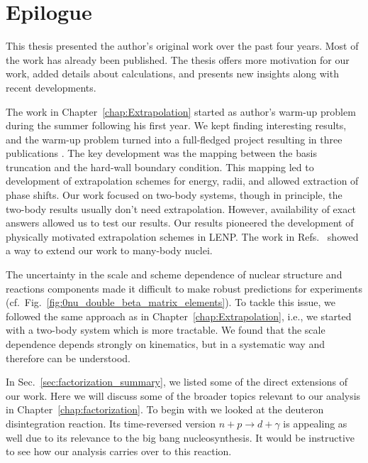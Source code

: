 \cleardoublepage
\chapter{Epilogue}

	This thesis presented the author's original work over the past four years.
	Most of the work has already been published.  The thesis offers more
	motivation for our work, added details about calculations, and
	presents new insights along with recent developments.

	The work in Chapter~\ref{chap:Extrapolation} started as author's warm-up
	problem during the summer following his first year.
	We kept finding
	interesting results, and the warm-up problem turned into a full-fledged
	project resulting in three publications
	\cite{More:2013rma,Furnstahl:2013vda,Konig:2014hma}.
	The key development was the mapping between the basis
	truncation and the hard-wall boundary condition.
	This mapping led to development of extrapolation schemes for energy, radii,
	and allowed extraction of phase shifts.
	Our work focused on two-body systems, though in principle, the
	two-body results usually don't need extrapolation.
	However, availability of exact answers allowed us to test our results.
	Our results pioneered
	the development of physically motivated extrapolation schemes in LENP.  
	The work in Refs.~\cite{Furnstahl:2014hca,Wendt:2015nba,Binder:2015trg}
	showed a way to extend our work to many-body nuclei.

	The uncertainty in the scale and scheme dependence of nuclear structure
	and reactions components made it difficult to make robust predictions
	for experiments (cf.~Fig.~\ref{fig:0nu_double_beta_matrix_elements}).
	To tackle this issue, we followed the same approach as in
	Chapter~\ref{chap:Extrapolation}, i.e., we started with a two-body
	system which is more tractable.  We found that the scale dependence
	depends strongly on kinematics, but in a systematic way and therefore
	can be understood.

	In Sec.~\ref{sec:factorization_summary}, we listed some of the direct
	extensions of our work.  Here we will discuss some of the broader topics
	relevant to our analysis in Chapter~\ref{chap:factorization}.  To
	begin with we looked at the deuteron disintegration reaction.  Its
	time-reversed version $n + p \rightarrow d + \gamma$ is appealing as
	well due to its relevance to the big bang nucleosynthesis.  It would be
	instructive to see how our analysis carries over to this reaction.

